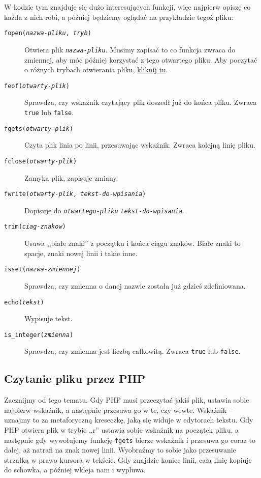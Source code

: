 \documentclass [a4paper, 10pt, oneside]{article}
\begin{document}
W kodzie tym znajduje się dużo interesujących funkcji, więc najpierw opiszę co każda z nich robi, a później będziemy oglądać na przykładzie tegoż pliku:

\begin{description}
    \item[\texttt{fopen(\textit{nazwa-pliku}, \textit{tryb})}] Otwiera plik \texttt{\textit{nazwa-pliku}}. Musimy zapisać to co funkcja zwraca do zmiennej, aby móc później korzystać z tego otwartego pliku. Aby poczytać o różnych trybach otwierania pliku, \hyperlink{tryby}{kliknij tu}.
    \item[\texttt{feof(\textit{otwarty-plik})}] Sprawdza, czy wskaźnik czytający plik doszedł już do końca pliku. Zwraca \texttt{true} lub \texttt{false}.
    \item[\texttt{fgets(\textit{otwarty-plik})}] Czyta plik linia po linii, przesuwając wskaźnik. Zwraca kolejną linię pliku.
    \item[\texttt{fclose(\textit{otwarty-plik})}] Zamyka plik, zapisuje zmiany.
    \item[\texttt{fwrite(\textit{otwarty-plik}, \textit{\texttt{tekst-do-wpisania}})}] Dopisuje do \texttt{\textit{otwartego-pliku}} \texttt{\textit{tekst-do-wpisania}}.
    \item[\texttt{trim(\textit{ciag-znakow})}] Usuwa ,,białe znaki'' z początku i końca ciągu znaków. Białe znaki to spacje, znaki nowej linii i takie inne.
    \item[\texttt{isset(\textit{nazwa-zmiennej})}] Sprawdza, czy zmienna o danej nazwie została już gdzieś zdefiniowana.
    \item[\texttt{echo(\textit{tekst})}] Wypisuje tekst.
    \item[\texttt{is\_integer(\textit{zmienna})}] Sprawdza, czy zmienna jest liczbą całkowitą. Zwraca \texttt{true} lub \texttt{false}.
\end{description}

\subsection{Czytanie pliku przez PHP}
Zacznijmy od tego tematu. Gdy PHP musi przeczytać jakiś plik, ustawia sobie najpierw wskaźnik, a następnie przesuwa go w te, czy wewte. Wskaźnik -- uznajmy to za metaforyczną kreseczkę, jaką się widuje w edytorach tekstu. Gdy PHP otwiera plik w trybie ,,r'' ustawia sobie wskaźnik na początek pliku, a następnie gdy wywołujemy funkcję \texttt{fgets} bierze wskaźnik i przesuwa go coraz to dalej, aż natrafi na znak nowej linii. Wyobraźmy to sobie jako przesuwanie strzałką w prawo kursora w tekście. Gdy znajdzie koniec linii, całą linię kopiuje do schowka, a później wkleja nam i wypluwa.
\end{document}
